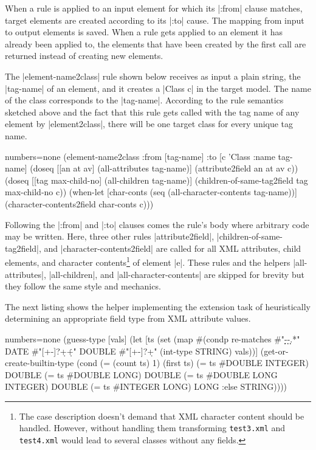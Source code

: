 \documentclass[submission]{eptcs}
\newcommand{\code}{\clojureinline}
\begin{document}
When a rule is applied to an input element for which its \code|:from| clause
matches, target elements are created according to its \code|:to| cause.  The
mapping from input to output elements is saved.  When a rule gets applied to an
element it has already been applied to, the elements that have been created by
the first call are returned instead of creating new elements.

The \code|element-name2class| rule shown below receives as input a plain
string, the \code|tag-name| of an element, and it creates a \code|Class c| in
the target model.  The name of the class corresponds to the \code|tag-name|.
According to the rule semantics sketched above and the fact that this rule gets
called with the tag name of any element by \code|element2class|, there will be
one target class for every unique tag name.

\begin{clojurecode*}{numbers=none}
  (element-name2class
   :from [tag-name]
   :to   [c 'Class {:name tag-name}]
   (doseq [[an at av] (all-attributes tag-name)]
     (attribute2field an at av c))
   (doseq [[tag max-child-no] (all-children tag-name)]
     (children-of-same-tag2field tag max-child-no c))
   (when-let [char-conts (seq (all-character-contents tag-name))]
     (character-contents2field char-conts c)))
\end{clojurecode*}

Following the \code|:from| and \code|:to| clauses comes the rule's body where
arbitrary code may be written.  Here, three other rules \code|attribute2field|,
\code|children-of-same-tag2field|, and \code|character-contents2field| are
called for all XML attributes, child elements, and character
contents\footnote{The case description doesn't demand that XML character
  content should be handled.  However, without handling them transforming
  \texttt{test3.xml} and \texttt{test4.xml} would lead to several classes
  without any fields.}  of element \code|e|.  These rules and the helpers
\code|all-attributes|, \code|all-children|, and \code|all-character-contents|
are skipped for brevity but they follow the same style and mechanics.

The next listing shows the helper implementing the extension task of
heuristically determining an appropriate field type from XML attribute values.

\begin{clojurecode*}{numbers=none}
  (guess-type [vals]
   (let [ts (set (map #(condp re-matches %
                         #"\d\d\d\d-\d\d-\d\d.*" DATE
                         #"[+-]?\d+\.\d+"        DOUBLE
                         #"[+-]?\d+"             (int-type %
                         STRING) vals))]
     (get-or-create-builtin-type
      (cond (= (count ts) 1)              (first ts)
            (= ts #{DOUBLE INTEGER})      DOUBLE
            (= ts #{DOUBLE LONG})         DOUBLE
            (= ts #{DOUBLE LONG INTEGER}) DOUBLE
            (= ts #{INTEGER LONG})        LONG
            :else                         STRING))))
\end{clojurecode*}
\end{document}

